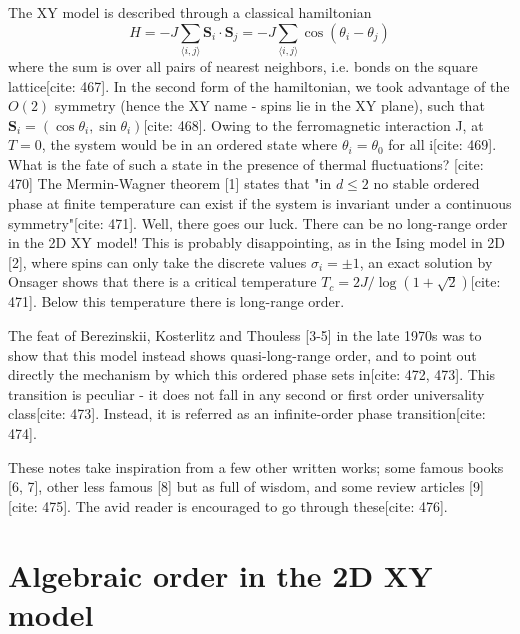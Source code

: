 \documentclass[11pt]{article}
\begin{document}
The XY model is described through a classical hamiltonian
\begin{equation}
 H = -J \sum_{\langle i,j \rangle} \mathbf{S}_i \cdot \mathbf{S}_j = -J \sum_{\langle i,j \rangle} \cos(\theta_i - \theta_j) \label{eq:intro_H}
\end{equation}
where the sum is over all pairs of nearest neighbors, i.e. bonds on the square lattice[cite: 467]. In the second form of the hamiltonian, we took advantage of the $O(2)$ symmetry (hence the XY name - spins lie in the XY plane), such that $\mathbf{S}_i = (\cos \theta_i, \sin \theta_i)$[cite: 468]. Owing to the ferromagnetic interaction J, at $T=0$, the system would be in an ordered state where $\theta_i = \theta_0$ for all i[cite: 469]. What is the fate of such a state in the presence of thermal fluctuations? [cite: 470] The Mermin-Wagner theorem [1] states that "in $d \le 2$ no stable ordered phase at finite temperature can exist if the system is invariant under a continuous symmetry"[cite: 471]. Well, there goes our luck. There can be no long-range order in the 2D XY model! This is probably disappointing, as in the Ising model in 2D [2], where spins can only take the discrete values $\sigma_i = \pm 1$, an exact solution by Onsager shows that there is a critical temperature $T_c = 2J / \log(1+\sqrt{2})$[cite: 471]. Below this temperature there is long-range order.

The feat of Berezinskii, Kosterlitz and Thouless [3-5] in the late 1970s was to show that this model instead shows quasi-long-range order, and to point out directly the mechanism by which this ordered phase sets in[cite: 472, 473]. This transition is peculiar - it does not fall in any second or first order universality class[cite: 473]. Instead, it is referred as an infinite-order phase transition[cite: 474].

These notes take inspiration from a few other written works; some famous books [6, 7], other less famous [8] but as full of wisdom, and some review articles [9][cite: 475]. The avid reader is encouraged to go through these[cite: 476].

\section{Algebraic order in the 2D XY model}
\end{document}
